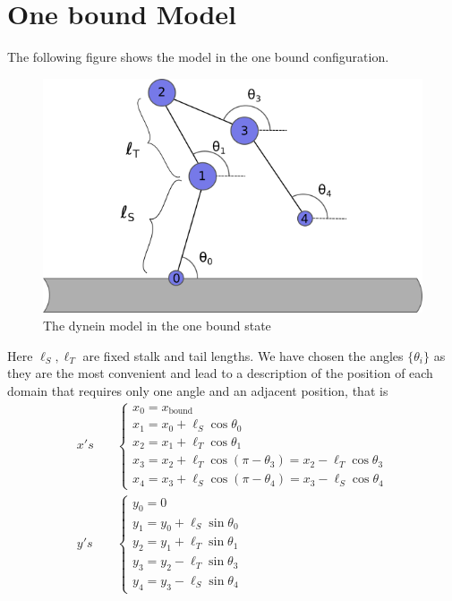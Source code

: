 \documentclass[a4paper, 11pt]{article}
\begin{document}
\section*{One bound Model}
The following figure shows the model in the one bound configuration.\\
\begin{figure}[!hbt]
  \centering
  \includegraphics[width=0.6\columnwidth]{onebound}
  \caption{The dynein model in the one bound state } 
\end{figure}

\noindent Here $\ell_S, \ell_T$ are fixed stalk and tail lengths. We have chosen the angles $\{\theta_i\}$ as they are the most convenient and lead to a description of the position of each domain that requires only one angle and an adjacent position, that is
\begin{align}
  x's \quad &\begin{cases}
    x_0 = x_\text{bound} \\
    x_1 = x_0 + \ell_S \cos\theta_0 \\
    x_2 = x_1 + \ell_T \cos\theta_1 \\
    x_3 = x_2 + \ell_T \cos(\pi-\theta_3) = x_2 - \ell_T\cos\theta_3 \\
    x_4 = x_3 + \ell_S \cos(\pi-\theta_4) = x_3 - \ell_S\cos\theta_4
  \end{cases} \\
  y's \quad &\begin{cases}
    y_0 = 0 \\
    y_1 = y_0 + \ell_S\sin\theta_0 \\
    y_2 = y_1 + \ell_T\sin\theta_1 \\
    y_3 = y_2 - \ell_T\sin\theta_3 \\
    y_4 = y_3 - \ell_S\sin\theta_4 
  \end{cases}
\end{align} 
\end{document}
